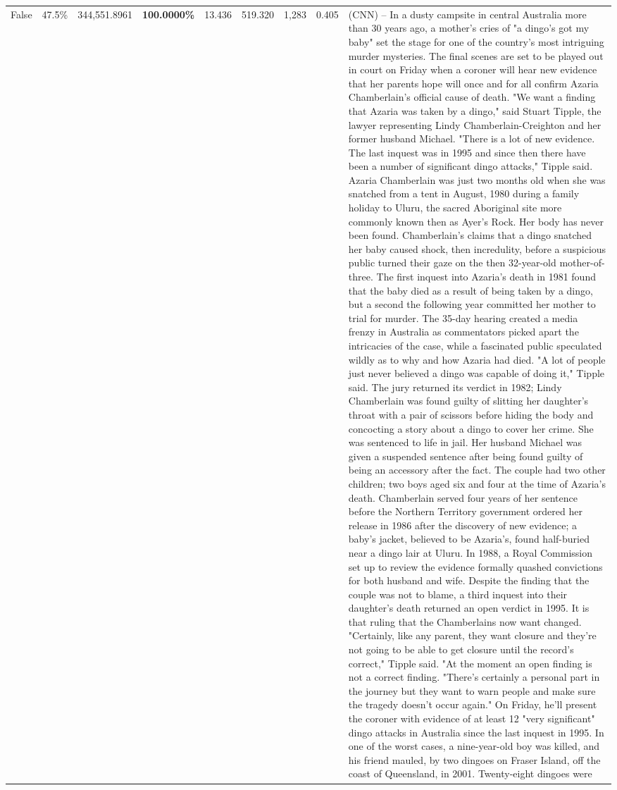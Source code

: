 \begin{table}[H]
\begin{tabular}{lllrlllll}
False & 47.5\% & 344,551.8961 & \bfseries \color{red} 100.0000\% & 13.436 & 519.320 & 1,283 & 0.405 & (CNN) -- In a dusty campsite in central Australia more than 30 years ago, a mother's cries of "a dingo's got my baby" set the stage for one of the country's most intriguing murder mysteries. The final scenes are set to be played out in court on Friday when a coroner will hear new evidence that her parents hope will once and for all confirm Azaria Chamberlain's official cause of death. "We want a finding that Azaria was taken by a dingo," said Stuart Tipple, the lawyer representing Lindy Chamberlain-Creighton and her former husband Michael. "There is a lot of new evidence. The last inquest was in 1995 and since then there have been a number of significant dingo attacks," Tipple said. Azaria Chamberlain was just two months old when she was snatched from a tent in August, 1980 during a family holiday to Uluru, the sacred Aboriginal site more commonly known then as Ayer's Rock. Her body has never been found. Chamberlain's claims that a dingo snatched her baby caused shock, then incredulity, before a suspicious public turned their gaze on the then 32-year-old mother-of-three. The first inquest into Azaria's death in 1981 found that the baby died as a result of being taken by a dingo, but a second the following year committed her mother to trial for murder. The 35-day hearing created a media frenzy in Australia as commentators picked apart the intricacies of the case, while a fascinated public speculated wildly as to why and how Azaria had died. "A lot of people just never believed a dingo was capable of doing it," Tipple said. The jury returned its verdict in 1982; Lindy Chamberlain was found guilty of slitting her daughter's throat with a pair of scissors before hiding the body and concocting a story about a dingo to cover her crime. She was sentenced to life in jail. Her husband Michael was given a suspended sentence after being found guilty of being an accessory after the fact. The couple had two other children; two boys aged six and four at the time of Azaria's death. Chamberlain served four years of her sentence before the Northern Territory government ordered her release in 1986 after the discovery of new evidence; a baby's jacket, believed to be Azaria's, found half-buried near a dingo lair at Uluru. In 1988, a Royal Commission set up to review the evidence formally quashed convictions for both husband and wife. Despite the finding that the couple was not to blame, a third inquest into their daughter's death returned an open verdict in 1995. It is that ruling that the Chamberlains now want changed. "Certainly, like any parent, they want closure and they're not going to be able to get closure until the record's correct," Tipple said. "At the moment an open finding is not a correct finding. "There's certainly a personal part in the journey but they want to warn people and make sure the tragedy doesn't occur again." On Friday, he'll present the coroner with evidence of at least 12 "very significant" dingo attacks in Australia since the last inquest in 1995. In one of the worst cases, a nine-year-old boy was killed, and his friend mauled, by two dingoes on Fraser Island, off the coast of Queensland, in 2001. Twenty-eight dingoes were 
\end{tabular}
\end{table}
